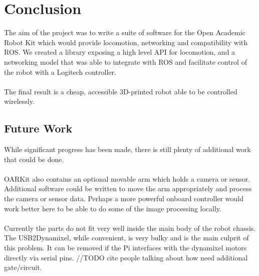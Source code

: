 \documentclass[]{article}
\begin{document}
\section{Conclusion}
The aim of the project was to write a suite of software for the Open Academic Robot Kit which would provide locomotion, networking and compatibility with ROS. We created a library exposing a high level API for locomotion, and a networking model that was able to integrate with ROS and facilitate control of the robot with a Logitech controller.
\\
\\
The final result is a cheap, accessible 3D-printed robot able to be controlled wirelessly.

\subsection{Future Work}
While significant progress has been made, there is still plenty of additional work that could be done.
\\
\\
OARKit also contains an optional movable arm which holds a camera or sensor. Additional software could be written to move the arm appropriately and process the camera or sensor data. Perhaps a more powerful onboard controller would work better here to be able to do some of the image processing locally.
\\
\\
Currently the parts do not fit very well inside the main body of the robot chassis. The USB2Dynamixel, while convenient, is very bulky and is the main culprit of this problem. It can be removed if the Pi interfaces with the dynamixel motors directly via serial pins. //TODO cite people talking about how need additional gate/circuit.
\end{document}

